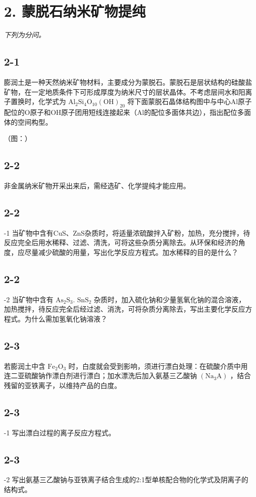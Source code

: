 \section*{2. 蒙脱石纳米矿物提纯}
\textit{下列为分问。}

\subsection*{2-1}
膨润⼟是⼀种天然纳⽶矿物材料，主要成分为蒙脱⽯。蒙脱⽯是层状结构的硅酸盐矿物，在⼀定地质条件下可形成厚度为纳⽶尺⼨的层状晶体。不考虑层间⽔和阳离⼦置换时，化学式为 $\mathrm { A l _ { 2 } S i _ { 4 } O _ { 1 0 } ( O H ) _ { 2 0 } }$ 将下⾯蒙脱⽯晶体结构图中与中⼼Al原⼦配位的O原⼦和OH原⼦团⽤短线连接起来（Al的配位多⾯体共边），指出配位多⾯体的空间构型。

（图：）

\subsection*{2-2}
⾮⾦属纳⽶矿物开采出来后，需经选矿、化学提纯才能应⽤。

\subsection*{2-2}
-1 当矿物中含有CuS、ZnS杂质时，将适量浓硫酸拌⼊矿粉，加热，充分搅拌，待反应完全后⽤⽔稀释、过滤、清洗，可将这些杂质分离除去。从环保和经济的⻆度，应尽量减少硫酸的⽤量，写出化学反应⽅程式。加⽔稀释的⽬的是什么？

\subsection*{2-2}
-2 当矿物中含有 ${ \mathrm { A s } } _ { 2 } { \mathrm { S } } _ { 3 } .$ $\mathrm { S n S _ { 2 } }$ 杂质时，加⼊硫化钠和少量氢氧化钠的混合溶液，加热搅拌，待反应完全后经过滤、消洗，可将杂质分离除去，写出主要化学反应⽅程式。为什么需加氢氧化钠溶液？

\subsection*{2-3}
若膨润⼟中含 $\mathrm { F e _ { 2 } O _ { 3 } }$ 时，⽩度就会受到影响，须进⾏漂⽩处理：在硫酸介质中⽤连⼆亚硫酸钠作漂⽩剂进⾏漂⽩；加⽔漂洗后加⼊氨基三⼄酸钠 $\left( \mathrm { N a } _ { 3 } \mathrm { A } \right)$ ，结合残留的亚铁离⼦，以维持产品的⽩度。

\subsection*{2-3}
-1 写出漂⽩过程的离⼦反应⽅程式。

\subsection*{2-3}
-2 写出氨基三⼄酸钠与亚铁离⼦结合⽣成的2:1型单核配合物的化学式及阴离⼦的结构式。
